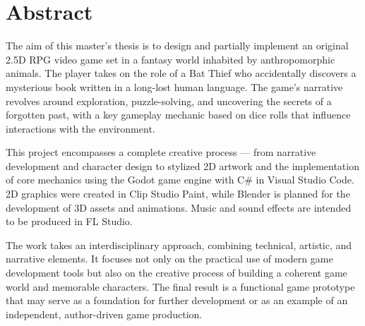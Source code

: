 
\section*{Abstract} 
The aim of this master's thesis is to design and partially implement an original 2.5D RPG video game set in a fantasy world inhabited by anthropomorphic animals. The player takes on the role of a Bat Thief who accidentally discovers a mysterious book written in a long-lost human language. The game's narrative revolves around exploration, puzzle-solving, and uncovering the secrets of a forgotten past, with a key gameplay mechanic based on dice rolls that influence interactions with the environment.

This project encompasses a complete creative process — from narrative development and character design to stylized 2D artwork and the implementation of core mechanics using the Godot game engine with C\# in Visual Studio Code. 2D graphics were created in Clip Studio Paint, while Blender is planned for the development of 3D assets and animations. Music and sound effects are intended to be produced in FL Studio.

The work takes an interdisciplinary approach, combining technical, artistic, and narrative elements. It focuses not only on the practical use of modern game development tools but also on the creative process of building a coherent game world and memorable characters. The final result is a functional game prototype that may serve as a foundation for further development or as an example of an independent, author-driven game production.



\cleardoublepage
